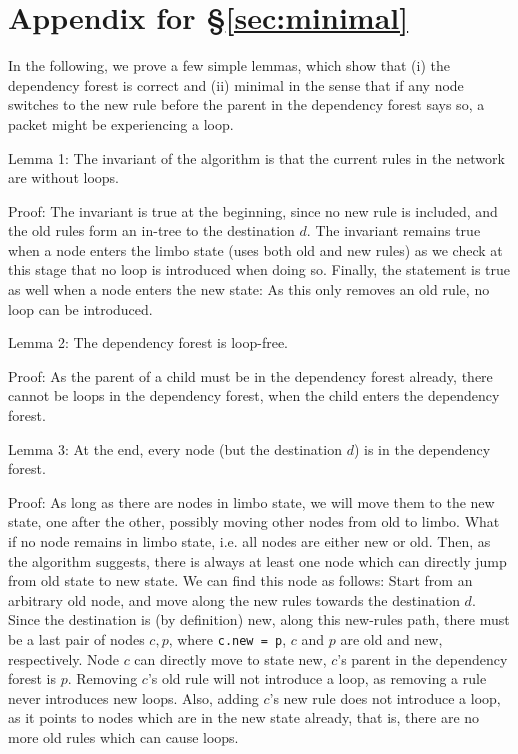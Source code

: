 \section{Appendix for \S\ref{sec:minimal}}

In the following, we prove a few simple lemmas, which show that (i) the dependency forest is correct and (ii) minimal in the sense that if any node switches to the new rule before the parent in the dependency forest says so, a packet might be experiencing a loop.

Lemma 1: The invariant of the algorithm is that the current rules in the network are without loops.

Proof: The invariant is true at the beginning, since no new rule is included, and the old rules form an in-tree to the destination $d$. The invariant remains true when a node enters the limbo state (uses both old and new rules) as we check at this stage that no loop is introduced when doing so. Finally, the statement is true as well when a node enters the new state: As this only removes an old rule, no loop can be introduced.

Lemma 2: The dependency forest is loop-free.

Proof: As the parent of a child must be in the dependency forest already, there cannot be loops in the dependency forest, when the child enters the dependency forest.

Lemma 3: At the end, every node (but the destination $d$) is in the dependency forest.

Proof: As long as there are nodes in limbo state, we will move them to the new state, one after the other, possibly moving other nodes from old to limbo. What if no node remains in limbo state, i.e. all nodes are either new or old. Then, as the algorithm suggests, there is always at least one node which can directly jump from old state to new state. We can find this node as follows: Start from an arbitrary old node, and move along the new rules towards the destination $d$. Since the destination is (by definition) new, along this new-rules path, there must be a last pair of nodes $c,p$, where \texttt{c.new = p}, $c$ and $p$ are old and new, respectively. Node $c$ can directly move to state new, $c$'s parent in the dependency forest is $p$. Removing $c$'s old rule will not introduce a loop, as removing a rule never introduces new loops. Also, adding $c$'s new rule does not introduce a loop, as it points to nodes which are in the new state already, that is, there are no more old rules which can cause loops.

